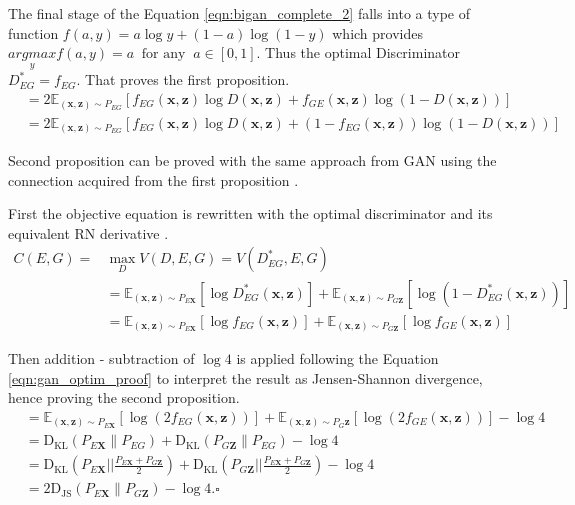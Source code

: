 The final stage of the Equation \ref{eqn:bigan_complete_2} falls into a type of function $ f(a,y) = a\log y + (1 -a) \log(1-y)$
\cite{Donahue2017AdversarialFL} which provides $\underset{y}{argmax} f(a,y) = a\ \text{ for any }\ a
\in [0,1]$. Thus the optimal Discriminator $D^*_{EG} = f_{EG}$. That proves the first proposition. 
\begin{align}
    &=2 \mathbb{E}_{(\mathbf{x}, \mathbf{z}) \sim P_{E G}}\left[f_{E G}(\mathbf{x}, \mathbf{z}) \log D(\mathbf{x}, \mathbf{z})+f_{G E}(\mathbf{x}, \mathbf{z}) \log (1-D(\mathbf{x}, \mathbf{z}))\right] \\[5pt]
    \label{eqn:bigan_complete_2}
    &=2 \mathbb{E}_{(\mathbf{x}, \mathbf{z}) \sim P_{E G}}\left[f_{E G}(\mathbf{x}, \mathbf{z}) \log D(\mathbf{x}, \mathbf{z})+\left(1-f_{E G}(\mathbf{x}, \mathbf{z})\right) \log (1-D(\mathbf{x}, \mathbf{z}))\right]
\end{align}

Second proposition can be proved with the same approach from
GAN \cite{Goodfellow:2014:GAN:2969033.2969125} using the connection acquired from the first
proposition \cite{Donahue2017AdversarialFL}.

First the objective equation is rewritten with the optimal discriminator and its equivalent RN
derivative \cite{Donahue2017AdversarialFL}.
\begin{align}
    C(E, G)=&\max _{D} V(D, E, G)=V\left(D_{E G}^{*}, E, G\right) \\[5pt]
    & =\mathbb{E}_{(\mathbf{x}, \mathbf{z}) \sim P_{E \mathbf{X}}}\left[\log D_{E G}^{*}(\mathbf{x}, \mathbf{z})\right]+\mathbb{E}_{(\mathbf{x}, \mathbf{z}) \sim P_{G \mathbf{Z}}}\left[\log \left(1-D_{E G}^{*}(\mathbf{x}, \mathbf{z})\right)\right] \\[5pt]
    & =\mathbb{E}_{(\mathbf{x}, \mathbf{z}) \sim P_{E \mathbf{X}}}\left[\log f_{E G}(\mathbf{x}, \mathbf{z})\right]+\mathbb{E}_{(\mathbf{x}, \mathbf{z}) \sim P_{G \mathbf{Z}}}\left[\log f_{G E}(\mathbf{x}, \mathbf{z})\right]
\end{align}

Then addition - subtraction of $\log4$ is applied following the Equation \ref{eqn:gan_optim_proof}
to interpret the result as Jensen-Shannon divergence, hence proving the second proposition.
\begin{align}
    &=\mathbb{E}_{(\mathbf{x}, \mathbf{z}) \sim P_{E \mathbf{X}}}\left[\log \left(2 f_{E G}(\mathbf{x}, \mathbf{z})\right)\right]+\mathbb{E}_{(\mathbf{x}, \mathbf{z}) \sim P_{G} \mathbf{z}}\left[\log \left(2 f_{G E}(\mathbf{x}, \mathbf{z})\right)\right]-\log 4 \\[5pt]
    & =\mathrm{D}_{\mathrm{KL}}\left(P_{E \mathbf{X}} \| P_{E G}\right)+\mathrm{D}_{\mathrm{KL}}\left(P_{G \mathbf{Z}} \| P_{E G}\right)-\log 4 \\[5pt]
    &=\mathrm{D}_{\mathrm{KL}}\left(P_{E \mathbf{X}}| | \frac{P_{E \mathbf{X}}+P_{G \mathbf{Z}}}{2}\right)+\mathrm{D}_{\mathrm{KL}}\left(P_{G \mathbf{Z}}| | \frac{P_{E \mathbf{X}}+P_{G \mathbf{Z}}}{2}\right)-\log 4 \\[5pt]
    & =2 \mathrm{D}_{\mathrm{JS}}\left(P_{E \mathbf{X}} \| P_{G \mathbf{Z}}\right)-\log 4 . \square
\end{align}

